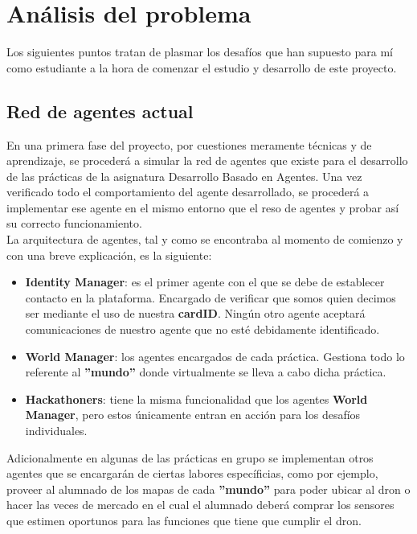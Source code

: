 \chapter{Análisis del problema}

Los siguientes puntos tratan de plasmar los desafíos que han supuesto para mí como estudiante a la hora de comenzar el estudio y desarrollo de este proyecto.
 
\section{Red de agentes actual}

En una primera fase del proyecto, por cuestiones meramente técnicas y de aprendizaje, se procederá a simular la red de agentes que existe para el desarrollo de las prácticas de la asignatura Desarrollo Basado en Agentes. Una vez verificado todo el comportamiento del agente desarrollado, se procederá a implementar ese agente en el mismo entorno que el reso de agentes y probar así su correcto funcionamiento.\\

La arquitectura de agentes, tal y como se encontraba al momento de comienzo y con una breve explicación, es la siguiente:

\begin{itemize}
	\item \textbf{Identity Manager}: es el primer agente con el que se debe de establecer contacto en la plataforma. Encargado de verificar que somos quien decimos ser mediante el uso de nuestra \textbf{cardID}. Ningún otro agente aceptará comunicaciones de nuestro agente que no esté debidamente identificado.
	\item \textbf{World Manager}: los agentes encargados de cada práctica. Gestiona todo lo referente al \textbf{''mundo''} donde virtualmente se lleva a cabo dicha práctica.
	\item \textbf{Hackathoners}: tiene la misma funcionalidad que los agentes \textbf{World Manager}, pero estos únicamente entran en acción para los desafíos individuales.
\end{itemize}

Adicionalmente en algunas de las prácticas en grupo se implementan otros agentes que se encargarán de ciertas labores específicias, como por ejemplo, proveer al alumnado de los mapas de cada \textbf{''mundo''} para poder ubicar al dron o hacer las veces de mercado en el cual el alumnado deberá comprar los sensores que estimen oportunos para las funciones que tiene que cumplir el dron.\\

